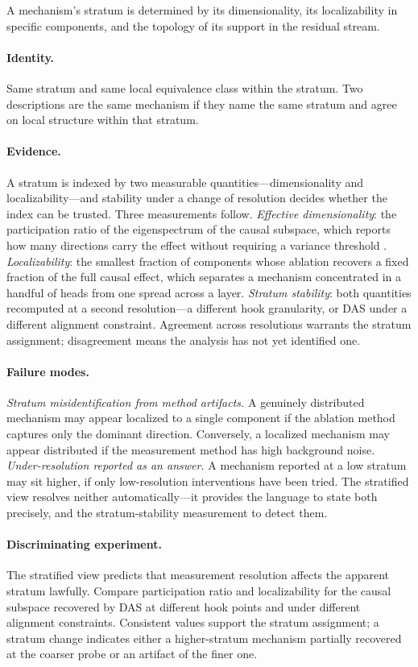 \documentclass{article}
\begin{document}
A mechanism's stratum is determined
by its dimensionality, its localizability in specific components, and
the topology of its support in the residual stream.

\paragraph{Identity.}
Same stratum and same local equivalence class within the stratum.  Two
descriptions are the same mechanism if they name the same stratum and
agree on local structure within that stratum.

\paragraph{Evidence.}
A stratum is indexed by two measurable quantities---dimensionality and
localizability---and stability under a change of resolution decides
whether the index can be trusted.  Three measurements follow.
\emph{Effective dimensionality}: the participation ratio of the
eigenspectrum of the causal subspace, which reports how many directions
carry the effect without requiring a variance threshold
\citep{gao2017}.  \emph{Localizability}: the smallest fraction of components
whose ablation recovers a fixed fraction of the full causal effect,
which separates a mechanism concentrated in a handful of heads from one
spread across a layer.  \emph{Stratum stability}: both quantities
recomputed at a second resolution---a different hook granularity, or DAS
under a different alignment constraint.  Agreement across resolutions
warrants the stratum assignment; disagreement means the analysis has not
yet identified one.

\paragraph{Failure modes.}
\emph{Stratum misidentification from method artifacts.}  A genuinely
distributed mechanism may appear localized to a single component if
the ablation method captures only the dominant direction.  Conversely,
a localized mechanism may appear distributed if the measurement method
has high background noise.  \emph{Under-resolution reported as an
answer.}  A mechanism reported at a low stratum may sit higher, if only
low-resolution interventions have been tried.  The stratified view
resolves neither automatically---it provides the language to state both
precisely, and the stratum-stability measurement to detect them.

\paragraph{Discriminating experiment.}
The stratified view predicts that measurement resolution affects the
apparent stratum lawfully.  Compare participation ratio and
localizability for the causal subspace recovered by DAS at different
hook points and under different alignment constraints.  Consistent
values support the stratum assignment; a stratum change indicates either
a higher-stratum mechanism partially recovered at the coarser probe or
an artifact of the finer one.
\end{document}
